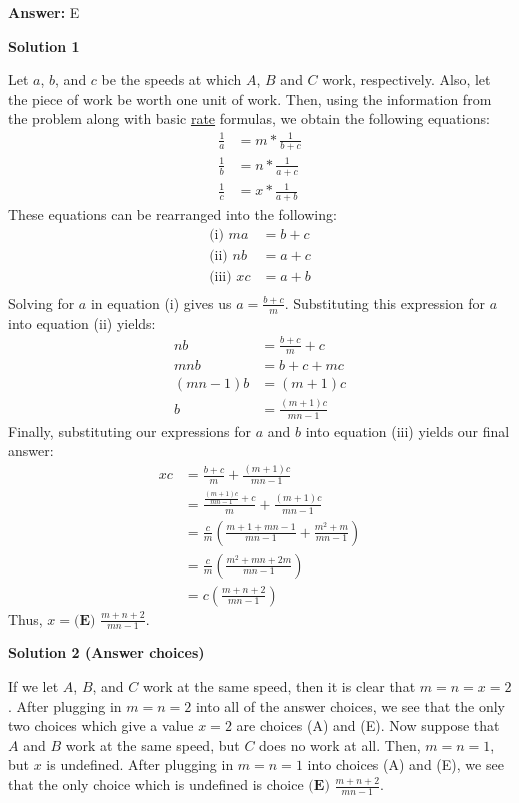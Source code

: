 \begin{enumerate}
 \textbf{Answer: }E



\textbf{Solution 1}

Let $a$, $b$, and $c$ be the speeds at which $A$, $B$ and $C$ work, respectively. Also, let the piece of work be worth one unit of work. Then, using the information from the problem along with basic \href{https://artofproblemsolving.com/wiki/index.php?title=Rate}{rate} formulas, we obtain the following equations:\begin{align*}\frac{1}{a}&=m*\frac{1}{b+c} \\\frac{1}{b}&=n*\frac{1}{a+c} \\\frac{1}{c}&=x*\frac{1}{a+b}\end{align*}
These equations can be rearranged into the following:\begin{align*}\text{(i) } ma&=b+c \\\text{(ii) } nb&=a+c \\\text{(iii) } xc&=a+b \\\end{align*}
Solving for $a$ in equation (i) gives us $a=\frac{b+c}{m}$. Substituting this expression for $a$ into equation (ii) yields:\begin{align*}nb&=\frac{b+c}{m}+c \\mnb&=b+c+mc \\(mn-1)b&=(m+1)c \\b&=\frac{(m+1)c}{mn-1} \end{align*}
Finally, substituting our expressions for $a$ and $b$ into equation (iii) yields our final answer:\begin{align*}xc&=\frac{b+c}{m}+\frac{(m+1)c}{mn-1} \\&=\frac{\frac{(m+1)c}{mn-1}+c}{m}+\frac{(m+1)c}{mn-1} \\&=\frac{c}{m}(\frac{m+1+mn-1}{mn-1}+\frac{m^2+m}{mn-1}) \\&=\frac{c}{m}(\frac{m^2+mn+2m}{mn-1}) \\&=c(\frac{m+n+2}{mn-1})\end{align*}
Thus, $x=\boxed{\textbf{(E) }\frac{m+n+2}{mn-1}}$.

 


 



\textbf{Solution 2 (Answer choices)}

If we let $A$, $B$, and $C$ work at the same speed, then it is clear that $m=n=x=2$. After plugging in $m=n=2$ into all of the answer choices, we see that the only two choices which give a value $x=2$ are choices (A) and (E). Now suppose that $A$ and $B$ work at the same speed, but $C$ does no work at all. Then, $m=n=1$, but $x$ is undefined. After plugging in $m=n=1$ into choices (A) and (E), we see that the only choice which is undefined is choice $\boxed{\textbf{(E) }\frac{m+n+2}{mn-1}}$.  


\end{enumerate}
